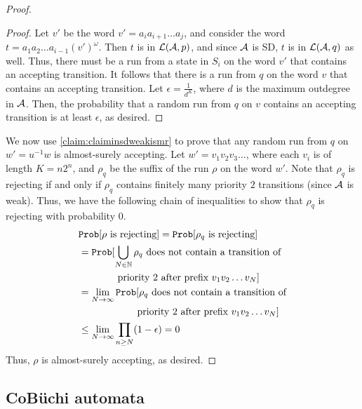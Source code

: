 \begin{proof}
\begin{proof}
        Let $v'$ be the word $v'=a_{i} a_{i+1} \dots a_j$, and consider the word $t = a_1 a_2 \dots a_{i-1} (v')^{\omega}$. Then $t$ is in $\mathcal{L}(\mathcal{A},p)$, and since $\mathcal{A}$ is SD, $t$ is in $\mathcal{L}(\mathcal{A},q)$ as well. Thus, there must be a run from a state in $S_i$ on the word $v'$ that contains an accepting transition. It follows that there is a run  from $q$ on the word $v$ that contains an accepting transition. Let $\epsilon=\frac{1}{d^K}$, where $d$ is the maximum outdegree in $\mathcal{A}$. Then, the probability that a random run from $q$ on $v$ contains an accepting transition is at least $\epsilon$, as desired.    
    \end{proof}
We now use \cref{claim:claiminsdweakismr} to prove that any random run from $q$ on $w'=u^{-1}w$ is almost-surely accepting. Let $w'=v_1v_2 v_3\dots$, where each $v_i$ is of length $K=n 2^n$, and $\rho_q$ be the suffix of the run $\rho$ on the word $w'$. Note that $\rho_q$ is rejecting if and only if $\rho_q$ contains finitely many priority $2$ transitions (since $\mathcal{A}$ is weak). Thus, we have the following chain of inequalities to show that $\rho_q$ is rejecting with probability $0$. 
\begin{equation*}
    \begin{split}
                &\mathtt{Prob}[\rho \text{ is rejecting}] = \mathtt{Prob}[\rho_q \text{ is rejecting}]\\
                &=\mathtt{Prob}[\bigcup_{N\in\mathbb{N}} \rho_q \text{ does not contain a transition of}\\ 
                &\quad\quad\quad\quad\text{priority 2 after prefix $v_1v_2\dots v_N$}]\\
                &=\lim_{N\to\infty}\mathtt{Prob}[\rho_q \text{ does not contain a transition of}\\ 
                &\quad\quad\quad\quad\quad\quad\text{priority 2 after prefix $v_1v_2\dots v_N$}] \\
        &\leq \lim_{N\to\infty} \prod_{n\geq N} (1-\epsilon) = 0\\  
    \end{split}
\end{equation*}
Thus, $\rho$ is almost-surely accepting, as desired.
\end{proof}

\subsection{CoB\"uchi automata}\label{app:succandcompCB}

